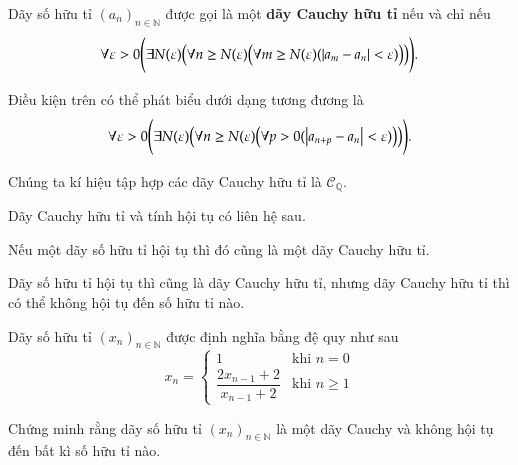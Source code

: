 \begin{definition}
    Dãy số hữu tỉ ${(a_{n})}_{n\in\mathbb{N}}$ được gọi là một \textbf{dãy Cauchy hữu tỉ} nếu và chỉ nếu
    \[
        \forall\varepsilon > 0 \Biggl( \exists N(\varepsilon) \Bigl( \forall n\geq N(\varepsilon) \bigl(\forall m\geq N(\varepsilon) (\left\vert{a_{m} - a_{n}}\right\vert < \varepsilon)\bigr) \Bigr) \Biggr).
    \]

    \noindent Điều kiện trên có thể phát biểu dưới dạng tương đương là
    \[
        \forall\varepsilon > 0 \Biggl( \exists N(\varepsilon) \Bigl( \forall n\geq N(\varepsilon) \bigl(\forall p > 0 (\left\vert{a_{n+p} - a_{n}}\right\vert < \varepsilon)\bigr) \Bigr) \Biggr).
    \]

    \noindent Chúng ta kí hiệu tập hợp các dãy Cauchy hữu tỉ là $\mathscr{C}_{\mathbb{Q}}$.
\end{definition}

Dãy Cauchy hữu tỉ và tính hội tụ có liên hệ sau.
\begin{theorem}
    Nếu một dãy số hữu tỉ hội tụ thì đó cũng là một dãy Cauchy hữu tỉ.
\end{theorem}

Dãy số hữu tỉ hội tụ thì cũng là dãy Cauchy hữu tỉ, nhưng dãy Cauchy hữu tỉ thì có thể không hội tụ đến số hữu tỉ nào.

\begin{proposition}
    Dãy số hữu tỉ ${(x_{n})}_{n\in\mathbb{N}}$ được định nghĩa bằng đệ quy như sau
    \[
        x_{n} = \begin{cases}
            1                                 & \text{khi $n = 0$}   \\
            \dfrac{2x_{n-1} + 2}{x_{n-1} + 2} & \text{khi $n\geq 1$}
        \end{cases}
    \]

    Chứng minh rằng dãy số hữu tỉ ${(x_{n})}_{n\in\mathbb{N}}$ là một dãy Cauchy và không hội tụ đến bất kì số hữu tỉ nào.
\end{proposition}

